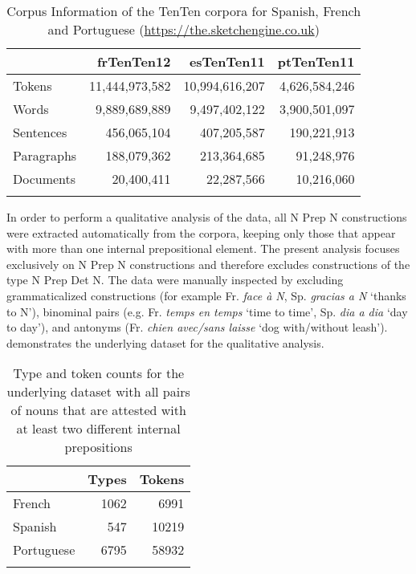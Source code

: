 \documentclass[output=paper]{langsci/langscibook}
\begin{document}
\begin{table}
\caption{Corpus Information of the TenTen corpora for Spanish, French and Portuguese (\url{https://the.sketchengine.co.uk})\label{tab:1:frequencies}}
 \begin{tabular}{lrrr} 
  \lsptoprule
            & frTenTen12 & esTenTen11 & ptTenTen11 \\ 
  \midrule
  Tokens  &   11,444,973,582 &    10,994,616,207     & 4,626,584,246\\
  Words  &   9,889,689,889 &  9,497,402,122 &    3,900,501,097\\
  Sentences  &  456,065,104 &  407,205,587 &    190,221,913\\
  Paragraphs  &  188,079,362 &  213,364,685 &    91,248,976\\
   Documents  &  20,400,411 &  22,287,566 &    10,216,060\\
  \lspbottomrule
 \end{tabular}
\end{table}


In order to perform a qualitative analysis of the data, all N Prep N constructions were extracted automatically from the corpora, keeping only those that appear with more than one internal prepositional element. The present analysis focuses exclusively on N Prep N constructions and therefore excludes constructions of the type N Prep Det N. The data were manually inspected by excluding grammaticalized constructions (for example Fr. \textit{face à N}, Sp. \textit{gracias a N} `thanks to N'), binominal pairs (e.g. Fr. \textit{temps en temps} `time to time', Sp. \textit{dia a dia} `day to day'), and antonyms (Fr. \textit{chien avec/sans laisse} `dog with/without leash').  demonstrates the underlying dataset for the qualitative analysis.

\begin{table}
\caption{Type and token counts for the underlying dataset with all pairs of nouns that are attested with at least two different internal prepositions\label{tab:2:frequencies}}
 \begin{tabular}{lrr} 
  \lsptoprule
            & Types & Tokens \\ 
  \midrule
  French  &   1062 &    6991     \\
  Spanish  &  547 &  10219 \\
  Portuguese  &  6795 &  58932 \\
  \lspbottomrule
 \end{tabular}
\end{table}
\end{document}
